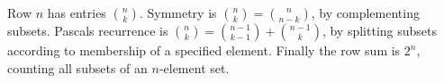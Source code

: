 Row $n$ has entries $\binom nk$. Symmetry is $\binom nk=\binom n{n-k}$, by complementing subsets. Pascal\textquotesingle s recurrence is $\binom nk=\binom{n-1}{k-1}+\binom{n-1}k$, by splitting subsets according to membership of a specified element. Finally the row sum is $2^n$, counting all subsets of an $n$-element set.
